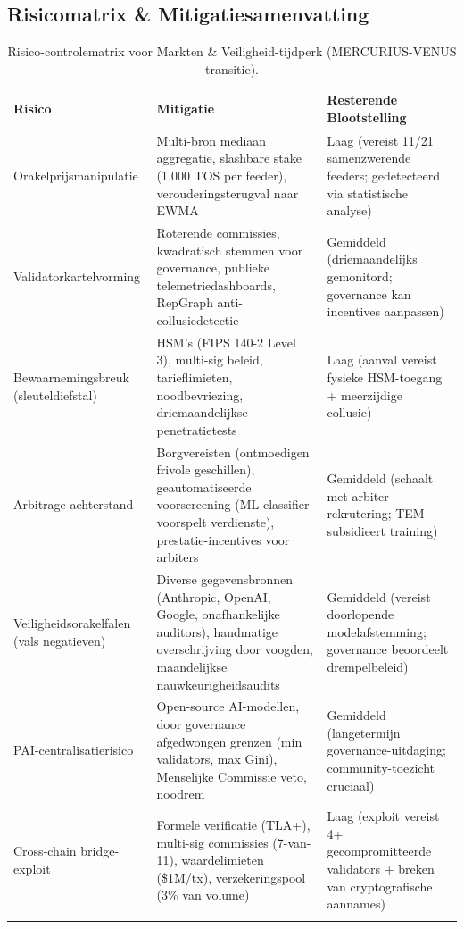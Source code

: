 \documentclass[11pt]{article}
\begin{document}
\subsection{Risicomatrix \& Mitigatiesamenvatting}
\begin{longtable}{@{}p{}p{}p{}@{}}
\toprule
\textbf{Risico} & \textbf{Mitigatie} & \textbf{Resterende Blootstelling} \\\midrule
Orakelprijsmanipulatie & Multi-bron mediaan aggregatie, slashbare stake (1.000 TOS per feeder), verouderingsterugval naar EWMA & Laag (vereist 11/21 samenzwerende feeders; gedetecteerd via statistische analyse) \\
Validatorkartelvorming & Roterende commissies, kwadratisch stemmen voor governance, publieke telemetriedashboards, RepGraph anti-collusiedetectie & Gemiddeld (driemaandelijks gemonitord; governance kan incentives aanpassen) \\
Bewaarnemingsbreuk (sleuteldiefstal) & HSM's (FIPS 140-2 Level 3), multi-sig beleid, tarieflimieten, noodbevriezing, driemaandelijkse penetratietests & Laag (aanval vereist fysieke HSM-toegang + meerzijdige collusie) \\
Arbitrage-achterstand & Borgvereisten (ontmoedigen frivole geschillen), geautomatiseerde voorscreening (ML-classifier voorspelt verdienste), prestatie-incentives voor arbiters & Gemiddeld (schaalt met arbiter-rekrutering; TEM subsidieert training) \\
Veiligheidsorakelfalen (vals negatieven) & Diverse gegevensbronnen (Anthropic, OpenAI, Google, onafhankelijke auditors), handmatige overschrijving door voogden, maandelijkse nauwkeurigheidsaudits & Gemiddeld (vereist doorlopende modelafstemming; governance beoordeelt drempelbeleid) \\
PAI-centralisatierisico & Open-source AI-modellen, door governance afgedwongen grenzen (min validators, max Gini), Menselijke Commissie veto, noodrem & Gemiddeld (langetermijn governance-uitdaging; community-toezicht cruciaal) \\
Cross-chain bridge-exploit & Formele verificatie (TLA+), multi-sig commissies (7-van-11), waardelimieten (\$1M/tx), verzekeringspool (3\% van volume) & Laag (exploit vereist 4+ gecompromitteerde validators + breken van cryptografische aannames) \\\bottomrule
\caption{Risico-controlematrix voor Markten \& Veiligheid-tijdperk (MERCURIUS-VENUS transitie).}
\label{tab:risk-markets-expanded}
\end{longtable}
\end{document}
